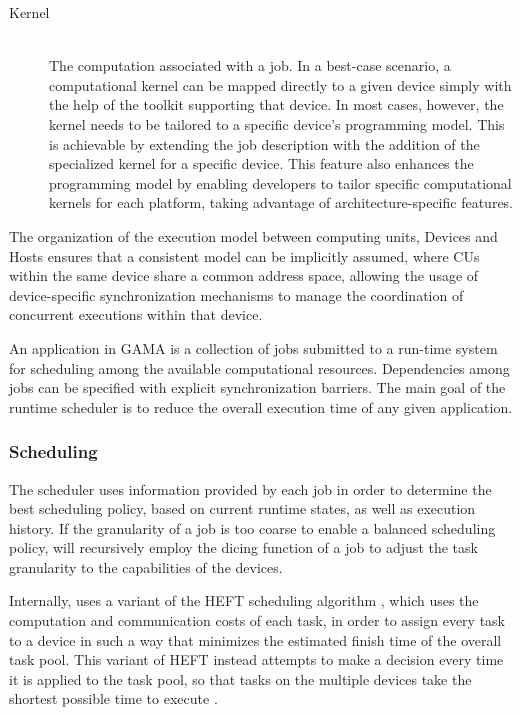 \documentclass[main.tex]{subfiles}
\begin{document}
\begin{description}
  \item[Kernel] \hfill \\
    The computation associated with a job. In a best-case scenario, a computational kernel can be mapped directly to a given device simply with the help of the toolkit supporting that device. In most cases, however, the kernel needs to be tailored to a specific device's programming model. This is achievable by extending the job description with the addition of the specialized kernel for a specific device. This feature also enhances the programming model by enabling developers to tailor specific computational kernels for each platform, taking advantage of architecture-specific features.

\end{description}

The organization of the execution model between computing units, Devices and Hosts ensures that a consistent model can be implicitly assumed, where \acsp{CU} within the same device share a common address space, allowing the usage of device-specific synchronization mechanisms to manage the coordination of concurrent executions within that device.

An application in GAMA is a collection of jobs submitted to a run-time system for scheduling among the available computational resources. Dependencies among jobs can be specified with explicit synchronization barriers. The main goal of the runtime scheduler is to reduce the overall execution time of any given application.

\subsubsection{Scheduling} \label{sec:gama_sched}

The scheduler uses information provided by each job in order to determine the best scheduling policy, based on current runtime states, as well as execution history. If the granularity of a job is too coarse to enable a balanced scheduling policy, \gama will recursively employ the dicing function of a job to adjust the task granularity to the capabilities of the devices.

Internally, \gama uses a variant of the \ac{HEFT} scheduling algorithm \cite{topcuoglu2002performance}, which uses the computation and communication costs of each task, in order to assign every task to a device in such a way that minimizes the estimated finish time of the overall task pool. This variant of \acs{HEFT} instead attempts to make a decision every time it is applied to the task pool, so that tasks on the multiple devices take the shortest possible time to execute \cite{thesisMariano12}.
\end{document}
